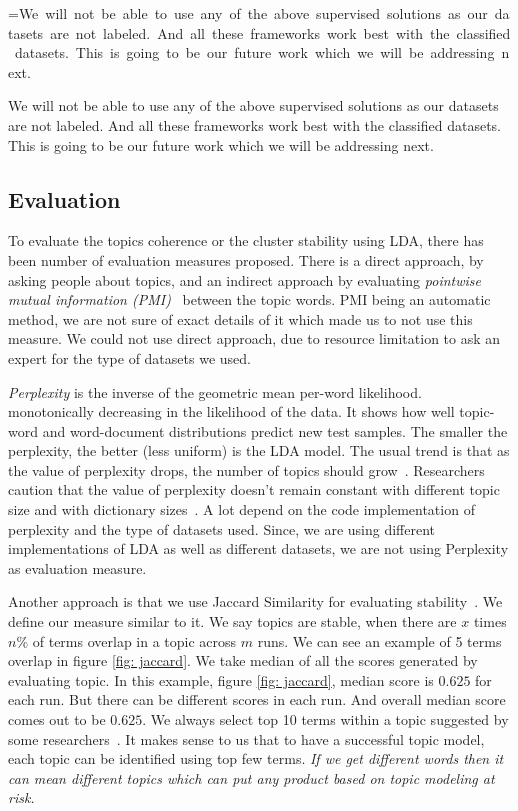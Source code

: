 \documentclass[conference]{IEEEtran}
\makeatletter
\newcommand{\mybox}[1]{%
  \setbox0=\hbox{#1}%
  \setlength{\@tempdima}{\dimexpr\linewidth}%
  \begin{tcolorbox}[colframe=mycolor,boxrule=0.5pt,arc=4pt,
      left=6pt,right=6pt,top=6pt,bottom=6pt,boxsep=0pt,width=\@tempdima]
    #1
  \end{tcolorbox}
}
\theoremstyle{break}
\makeatother
\begin{document}
\mybox{We will not be able to use any of the above supervised solutions as our datasets are not labeled. And all these frameworks work best with the classified datasets. This is going to be our future work which we will be addressing next.}

\subsection{Evaluation}
\label{sect: evaluation}
To evaluate the topics coherence or the cluster stability using LDA, there has been number of evaluation measures proposed. There is a direct approach, by asking people about topics, and an indirect approach by evaluating \textit{pointwise mutual information (PMI)}~\cite{lau2014machine, o2015analysis} between the topic words. PMI being an automatic method, we are not sure of exact details of it which made us to not use this measure. We could not use direct approach, due to resource limitation to ask an expert for the type of datasets we used.

\textit{Perplexity} is  the inverse of the geometric mean per-word likelihood. monotonically decreasing in the likelihood of the data. It shows how well topic-word and word-document distributions predict new test samples. The smaller the perplexity, the better (less uniform) is the LDA model. The usual trend is that as the value of perplexity drops, the number of topics should grow~\cite{koltcov2014latent}. Researchers caution that the value of perplexity doesn't remain constant with different topic size and with dictionary sizes~\cite{koltcov2014latent, zhao2015heuristic}. A lot depend on the code implementation of perplexity and the type of datasets used. Since, we are using different implementations of LDA as well as different datasets, we are not using Perplexity as evaluation measure.

Another approach is that we use Jaccard Similarity for evaluating stability~\cite{o2015analysis, galvis2013analysis}. We define our measure similar to it. We say topics are stable, when there are $x$ times $n\%$ of terms overlap in a topic across $m$ runs. We can see an example of 5 terms overlap in figure \ref{fig: jaccard}. We take median of all the scores generated by evaluating topic. In this example, figure \ref{fig: jaccard}, median score is $0.625$ for each run. But there can be different scores in each run. And overall median score comes out to be $0.625$. We always select top 10 terms within a topic suggested by some researchers~\cite{panichella2013effectively, lukins2010bug}. It makes sense to us that to have a successful topic model, each topic can be identified using top few terms. \textit{If we get different words then it can mean different topics which can put any product based on topic modeling at risk.}
\end{document}
